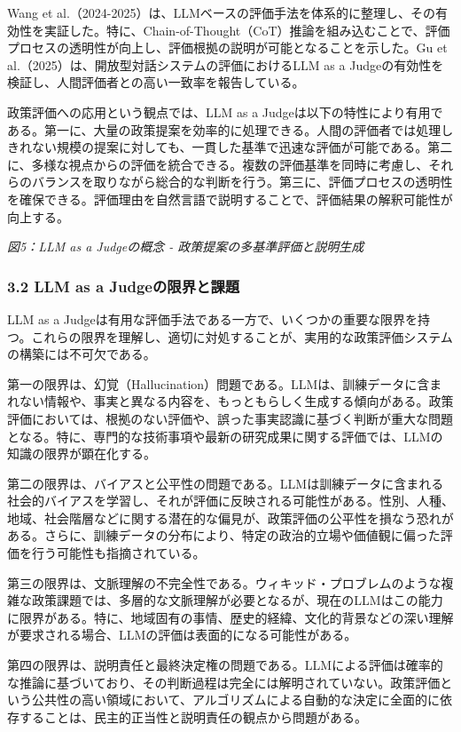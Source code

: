 Wang et al.（2024-2025）は、LLMベースの評価手法を体系的に整理し、その有効性を実証した。特に、Chain-of-Thought（CoT）推論を組み込むことで、評価プロセスの透明性が向上し、評価根拠の説明が可能となることを示した。Gu et al.（2025）は、開放型対話システムの評価におけるLLM as a Judgeの有効性を検証し、人間評価者との高い一致率を報告している。

政策評価への応用という観点では、LLM as a Judgeは以下の特性により有用である。第一に、大量の政策提案を効率的に処理できる。人間の評価者では処理しきれない規模の提案に対しても、一貫した基準で迅速な評価が可能である。第二に、多様な視点からの評価を統合できる。複数の評価基準を同時に考慮し、それらのバランスを取りながら総合的な判断を行う。第三に、評価プロセスの透明性を確保できる。評価理由を自然言語で説明することで、評価結果の解釈可能性が向上する。

\pandocbounded{}
\emph{図5：LLM as a Judgeの概念 - 政策提案の多基準評価と説明生成}

\subsubsection{3.2 LLM as a Judgeの限界と課題}\label{llm-as-a-judgeux306eux9650ux754cux3068ux8ab2ux984c}

LLM as a Judgeは有用な評価手法である一方で、いくつかの重要な限界を持つ。これらの限界を理解し、適切に対処することが、実用的な政策評価システムの構築には不可欠である。

第一の限界は、幻覚（Hallucination）問題である。LLMは、訓練データに含まれない情報や、事実と異なる内容を、もっともらしく生成する傾向がある。政策評価においては、根拠のない評価や、誤った事実認識に基づく判断が重大な問題となる。特に、専門的な技術事項や最新の研究成果に関する評価では、LLMの知識の限界が顕在化する。

第二の限界は、バイアスと公平性の問題である。LLMは訓練データに含まれる社会的バイアスを学習し、それが評価に反映される可能性がある。性別、人種、地域、社会階層などに関する潜在的な偏見が、政策評価の公平性を損なう恐れがある。さらに、訓練データの分布により、特定の政治的立場や価値観に偏った評価を行う可能性も指摘されている。

第三の限界は、文脈理解の不完全性である。ウィキッド・プロブレムのような複雑な政策課題では、多層的な文脈理解が必要となるが、現在のLLMはこの能力に限界がある。特に、地域固有の事情、歴史的経緯、文化的背景などの深い理解が要求される場合、LLMの評価は表面的になる可能性がある。

第四の限界は、説明責任と最終決定権の問題である。LLMによる評価は確率的な推論に基づいており、その判断過程は完全には解明されていない。政策評価という公共性の高い領域において、アルゴリズムによる自動的な決定に全面的に依存することは、民主的正当性と説明責任の観点から問題がある。

